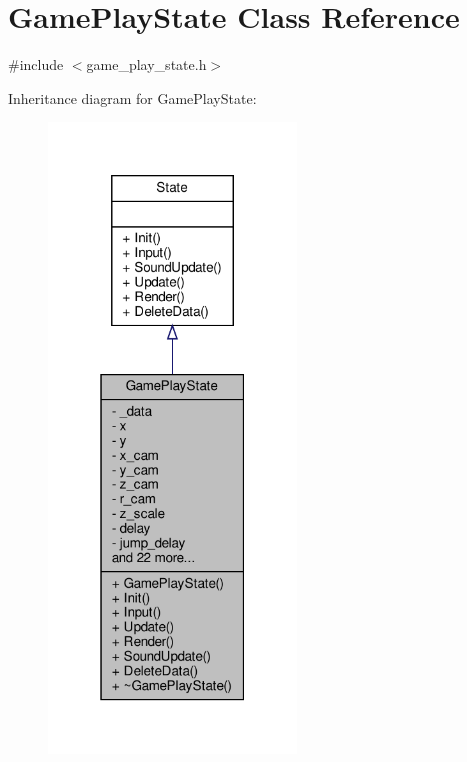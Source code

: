 \hypertarget{classGamePlayState}{}\section{Game\+Play\+State Class Reference}
\label{classGamePlayState}


{\ttfamily \#include $<$game\+\_\+play\+\_\+state.\+h$>$}



Inheritance diagram for Game\+Play\+State\+:
\nopagebreak
\begin{figure}[H]
\begin{center}
\leavevmode
\includegraphics[width=187pt]{classGamePlayState__inherit__graph}
\end{center}
\end{figure}


